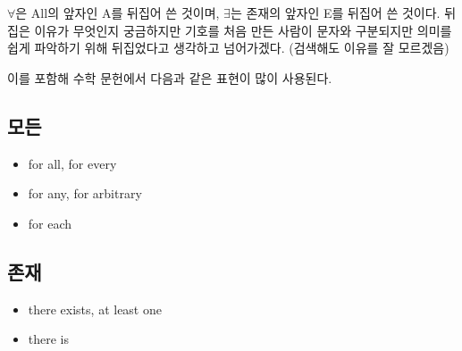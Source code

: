 \documentclass[../note.tex]{subfiles}
\begin{document}
$\forall$은 All의 앞자인 A를 뒤집어 쓴 것이며, $\exists$는 존재의 앞자인 E를 뒤집어 쓴 것이다. 뒤집은 이유가 무엇인지 궁금하지만 기호를 처음 만든 사람이 문자와 구분되지만 의미를 쉽게 파악하기 위해 뒤집었다고 생각하고 넘어가겠다. (검색해도 이유를 잘 모르겠음)

이를 포함해 수학 문헌에서 다음과 같은 표현이 많이 사용된다.

\subsection{모든}
\begin{itemize}
  \item
    for all, for every
  \item
    for any, for arbitrary
  \item
    for each
\end{itemize}
\subsection{존재}
\begin{itemize}
  \item
    there exists, at least one
  \item
    there is
\end{itemize}
\end{document}
